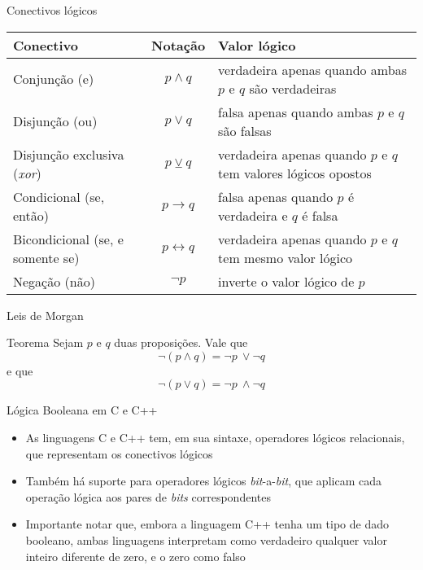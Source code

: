 \begin{frame}[fragile]{Conectivos lógicos}

    \begin{table}[h]
    \centering

    \begin{tabularx}{0.9\textwidth}{lcX}
        \toprule
        \textbf{Conectivo} & \textbf{Notação} & \textbf{Valor lógico} \\
        \midrule
        Conjunção (e) & $p \land q$ & verdadeira apenas quando ambas $p$ e $q$ são verdadeiras\\
        \rowcolor[gray]{0.9}
        Disjunção (ou) & $p \lor q$ & falsa apenas quando ambas $p$ e $q$ são falsas\\
        Disjunção exclusiva (\textit{xor}) & $p \veebar q$ & verdadeira apenas quando $p$ e $q$ tem valores lógicos opostos \\
        \rowcolor[gray]{0.9}
        Condicional (se, então) & $p \to q$ & falsa apenas quando $p$ é verdadeira e $q$ é falsa\\
        Bicondicional (se, e somente se) & $p \leftrightarrow q$ & verdadeira apenas quando $p$ e $q$ tem mesmo valor lógico\\
        \rowcolor[gray]{0.9}
        Negação (não) & $\lnot p$ & inverte o valor lógico de $p$\\
        \bottomrule
    \end{tabularx}
    \end{table}

\end{frame}

\begin{frame}[fragile]{Leis de Morgan}

    \begin{block}{Teorema}
        Sejam $p$ e $q$ duas proposições. Vale que
        $$
            \lnot (p \land q) = \lnot p\ \lor \lnot q
        $$
        e que
        $$
            \lnot (p \lor q) = \lnot p\ \land \lnot q
        $$
    \end{block}

\end{frame}

\begin{frame}[fragile]{Lógica Booleana em C e C++}

    \begin{itemize}
        \item As linguagens C e C++ tem, em sua sintaxe, operadores lógicos relacionais, que representam os conectivos lógicos

        \item Também há suporte para operadores lógicos \textit{bit}-a-\textit{bit}, que aplicam cada operação lógica aos pares de \textit{bits} correspondentes 

        \item Importante notar que, embora a linguagem C++ tenha um tipo de dado booleano, ambas linguagens interpretam como verdadeiro qualquer valor inteiro 
            diferente de zero, e o zero como falso
    \end{itemize}

\end{frame}

